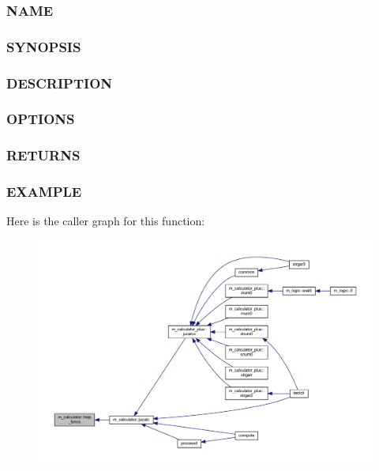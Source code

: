 \subsubsection*{N\+A\+ME}

\subsubsection*{S\+Y\+N\+O\+P\+S\+IS}

\subsubsection*{D\+E\+S\+C\+R\+I\+P\+T\+I\+ON}

\subsubsection*{O\+P\+T\+I\+O\+NS}

\subsubsection*{R\+E\+T\+U\+R\+NS}

\subsubsection*{E\+X\+A\+M\+P\+LE}Here is the caller graph for this function\+:
\nopagebreak
\begin{figure}[H]
\begin{center}
\leavevmode
\includegraphics[width=350pt]{namespacem__calculator_a190e152c2fc309d59e75ee4645e6d261_icgraph}
\end{center}
\end{figure}
\mbox{\label{namespacem__calculator_a192c846b6a8d40ddfe603f988ff82381}} 

